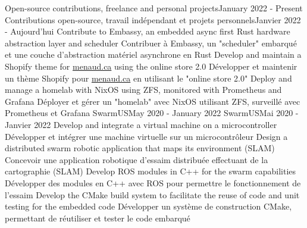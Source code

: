             \resumeItemListEnd
    \resumeSubHeadingListEnd

    \resumeSubHeadingListStart
        \resumeProjectHeadingEnFr
              {Open-source contributions, freelance and personal projects}{January 2022 - Present}
              {Contributions open-source, travail indépendant et projets personnels}{Janvier 2022 - Aujourd’hui}
                \resumeItemListStart
                    \resumeItemEnFr
                        {Contribute to Embassy, an embedded async first Rust hardware abstraction layer and scheduler}
                        {Contribuer à Embassy, un "scheduler" embarqué et une couche d'abstraction matériel asynchrone en Rust}
                    \resumeItemEnFr
                        {Develop and maintain a Shopify theme for \href{https://menaud.ca/}{menaud.ca} using the online store 2.0}
                        {Développer et maintenir un thème Shopify pour \href{https://menaud.ca/}{menaud.ca} en utilisant le "online store 2.0"}
                    \resumeItemEnFr
                        {Deploy and manage a homelab with NixOS using ZFS, monitored with Prometheus and Grafana}
                        {Déployer et gérer un "homelab" avec NixOS utilisant ZFS, surveillé avec Prometheus et Grafana}
                \resumeItemListEnd
      \resumeProjectHeadingEnFr
          {SwarmUS}{May 2020 - January 2022}
          {SwarmUS}{Mai 2020 - Janvier 2022}
            \resumeItemListStart
                \resumeItemEnFr
                    {Develop and integrate a virtual machine on a microcontroller}
                    {Développer et intégrer une machine virtuelle sur un microcontrôleur}
                \resumeItemEnFr
                    {Design a distributed swarm robotic application that maps its environment (SLAM)}
                    {Concevoir une application robotique d’essaim distribuée effectuant de la cartographie (SLAM)}
                \resumeItemEnFr
                    {Develop ROS modules in C++ for the swarm capabilities}
                    {Développer des modules en C++ avec ROS pour permettre le fonctionnement de l’essaim}
                \resumeItemEnFr
                    {Develop the CMake build system to facilitate the reuse of code and unit testing for the embedded code}
                    {Développer un système de construction CMake, permettant de réutiliser et tester le code embarqué}
            \resumeItemListEnd
    \resumeSubHeadingListEnd

